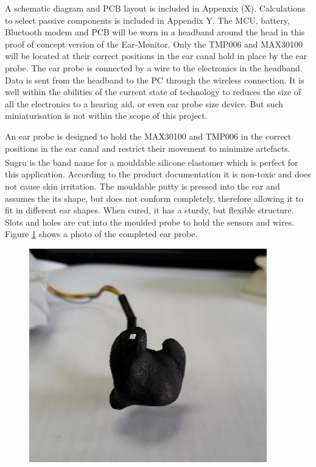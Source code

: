 A schematic diagram and PCB layout is included in Appenxix (X). Calculations to select passive components is included in Appendix Y. The MCU, battery, Bluetooth modem and PCB will be worn in a headband around the head in this proof of concept version of the Ear-Monitor. Only the TMP006 and MAX30100 will be located at their correct positions in the ear canal hold in place by the ear probe. The ear probe is connected by a wire to the electronics in the headband. Data is sent from the headband to the PC through the wireless connection. It is well within the abilities of the current state of technology to reduces the size of all the electronics to a hearing aid, or even ear probe size device. But such miniaturisation is not within the scope of this project.

\medskip

An ear probe is designed to hold the MAX30100 and TMP006 in the correct positions in the ear canal and restrict their movement to minimize artefacts. Sugru\textsuperscript{\textregistered} is the band name for a mouldable silicone elastomer which is perfect for this application. According to the product documentation it is non-toxic and does not cause skin irritation. The mouldable putty is pressed into the ear and assumes the its shape, but does not conform completely, therefore allowing it to fit in different ear shapes. When cured, it has a sturdy, but flexible structure. Slots and holes are cut into the moulded probe to hold the sensors and wires. Figure \ref{fig:EarProbe} shows a photo of the completed ear probe.

\begin{figure}[H]
   \centering
   \includegraphics[scale=1]{figs/EarProbe.jpg}
   \caption{}
   \label{fig:EarProbe}
\end{figure}

